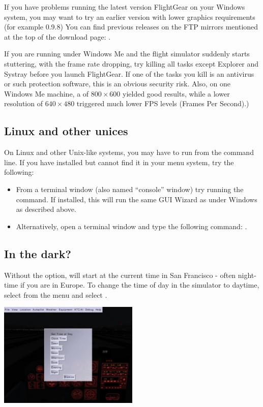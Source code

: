 If you have problems running the latest version FlightGear on
your Windows system, you may want to try an earlier version with lower
graphics requirements (for example 0.9.8) You can find previous releases on 
the FTP mirrors mentioned at the top of the \FlightGear{} download page:
.
   
If you are running under Windows Me and the flight simulator suddenly starts
stuttering, with the frame rate dropping, 
try killing all tasks except Explorer and Systray before you
launch FlightGear. If one of the tasks you kill is an antivirus or
such protection software, this is an obvious security risk. Also, on one
Windows Me machine, a \FlightGear{} of $800\times600$ yielded good results,
while a lower resolution of $640\times480$ triggered much lower FPS levels 
(Frames Per Second).)

\subsection{Linux and other unices}

On Linux and other Unix-like systems, you may have to run \FlightGear{} from 
the command line. If you have installed \FlightGear{} but cannot find it 
in your menu system, try the 
following:

\begin{itemize}
  \item From a terminal window (also named ``console'' window) try
  running the   command. If installed, this will run the same 
  GUI Wizard as under Windows as described above.

	\item Alternatively, open a terminal window and type the following command:
  . 
\end{itemize}

\subsection{In the dark?}

Without the  option, \FlightGear{} will start at the 
current time in San Francisco - often night-time if you are in Europe. To 
change the time of day in the simulator to daytime, select
 from the menu and select .

\begin{center}
\includegraphics[width=0.5\textwidth]{img/tut_5}
\end{center}


